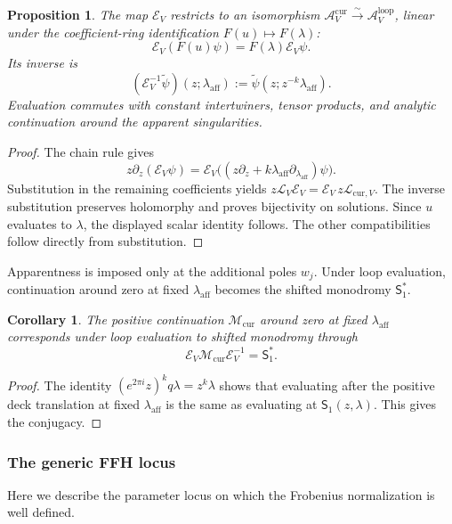 \documentclass[11pt,leqno]{amsart}
\numberwithin{equation}{section}
\theoremstyle{plain}
\newtheorem{proposition}[theorem]{Proposition}
\newtheorem{corollary}[theorem]{Corollary}
\theoremstyle{definition}
\theoremstyle{plain}
\theoremstyle{definition}
\theoremstyle{remark}
\begin{document}
\begin{proposition}\label{lem:loop-current-comparison}
The map $\mathscr E_V$ restricts to an isomorphism
$\mathcal A_V^{\mathrm{cur}}\xrightarrow{\sim}\mathcal A_V^{\mathrm{loop}}$,
linear under the coefficient-ring identification $F(u)\mapsto F(\lambda)$:
\[
 \mathscr E_V(F(u)\psi)=F(\lambda)\mathscr E_V\psi.
\]
Its inverse is
\[
 (\mathscr E_V^{-1}\widetilde\psi)(z;\lambda_{\mathrm{aff}})
 :=\widetilde\psi(z;z^{-k}\lambda_{\mathrm{aff}}).
\]
Evaluation commutes with constant intertwiners, tensor products, and analytic continuation around the apparent singularities.
\end{proposition}
\begin{proof}
The chain rule gives
\[
 z\partial_z(\mathscr E_V\psi)
 =\mathscr E_V\bigl((z\partial_z
       +k\lambda_{\mathrm{aff}}\partial_{\lambda_{\mathrm{aff}}})\psi\bigr).
\]
Substitution in the remaining coefficients yields
$z\mathcal L_V\mathscr E_V=\mathscr E_V\,z\mathcal L_{\mathrm{cur},V}$.
The inverse substitution preserves holomorphy and proves bijectivity on solutions.  Since $u$ evaluates to $\lambda$, the displayed scalar identity follows.  The other compatibilities follow directly from substitution.
\end{proof}

Apparentness is imposed only at the additional poles $w_j$.  Under loop evaluation, continuation around zero at fixed $\lambda_{\mathrm{aff}}$ becomes the shifted monodromy $\mathsf S_1^*$.
\begin{corollary}\label{cor:FFH-current-monodromy}
The positive continuation $\mathcal M_{\mathrm{cur}}$ around zero at fixed $\lambda_{\mathrm{aff}}$ corresponds under loop evaluation to shifted monodromy through
\[
 \mathscr E_V\mathcal M_{\mathrm{cur}}\mathscr E_V^{-1}=\mathsf S_1^*.
\]
\end{corollary}
\begin{proof}
The identity $(e^{2\pi i}z)^kq\lambda=z^k\lambda$ shows that evaluating after the positive deck translation at fixed $\lambda_{\mathrm{aff}}$ is the same as evaluating at $\mathsf S_1(z,\lambda)$.  This gives the conjugacy.
\end{proof}

\subsubsection{The generic FFH locus}
Here we describe the parameter locus on which the Frobenius normalization is well defined.
\end{document}
